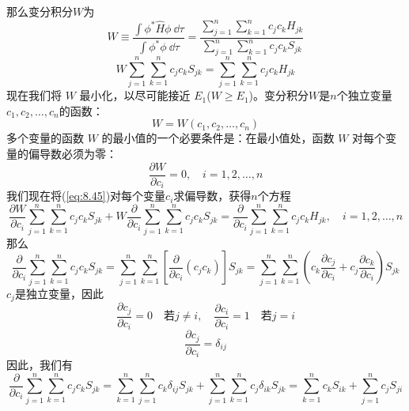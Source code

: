     那么变分积分$W$为
    \begin{equation}
        W \equiv \frac{\int \phi^{\ast} \hat{H} \phi\:\dd \tau}{\int \phi^{\ast} \phi\:\dd \tau} = \frac{\sum_{j=1}^{n}\sum_{k=1}^{n}c_jc_kH_{jk}}{\sum_{j=1}^{n}\sum_{k=1}^{n}c_jc_kS_{jk}}
        \label{eq:8.44}
    \end{equation}
    \begin{equation}
        W\sum_{j=1}^{n}\sum_{k=1}^{n}c_jc_kS_{jk} = \sum_{j=1}^{n}\sum_{k=1}^{n}c_jc_kH_{jk}
        \label{eq:8.45}
    \end{equation}
    现在我们将 $W$ 最小化，以尽可能接近 $E_1$($W \geq E_1$)。变分积分$W$是$n$个独立变量$c_1,c_2,\ldots,c_n$的函数：
    \begin{equation*}
        W = W\left(c_1,c_2,\ldots,c_n\right)
    \end{equation*}
    多个变量的函数 $W$ 的最小值的一个必要条件是：在最小值处，函数 $W$ 对每个变量的偏导数必须为零：
    \begin{equation}
        \frac{\partial W}{\partial c_i} = 0, \quad i = 1,2,\ldots,n
        \label{eq:8.46}
    \end{equation}
    我们现在将(\ref{eq:8.45})对每个变量$c_i$求偏导数，获得$n$个方程
    \begin{equation}
        \frac{\partial W}{\partial c_i}\sum_{j=1}^{n}\sum_{k=1}^{n}c_jc_kS_{jk} + W\frac{\partial}{\partial c_i}\sum_{j=1}^{n}\sum_{k=1}^{n}c_jc_kS_{jk} = \frac{\partial}{\partial c_i}\sum_{j=1}^{n}\sum_{k=1}^{n}c_jc_kH_{jk}, \quad i = 1,2,\ldots,n
        \label{eq:8.47}
    \end{equation}
    那么
    \begin{equation*}
        \frac{\partial}{\partial c_i}\sum_{j=1}^{n}\sum_{k=1}^{n}c_jc_kS_{jk} = \sum_{j=1}^{n}\sum_{k=1}^{n}\left[\frac{\partial}{\partial c_i}\left(c_jc_k\right)\right]S_{jk} = \sum_{j=1}^{n}\sum_{k=1}^{n}\left(c_k\frac{\partial c_j}{\partial c_i} + c_j\frac{\partial c_k}{\partial c_i}\right)S_{jk}
    \end{equation*}
    $c_j$是独立变量，因此
    \begin{equation*}
        \frac{\partial c_j}{\partial c_i} = 0 \quad \text{若} j \neq i, \quad \frac{\partial c_i}{\partial c_i} = 1
        \quad \text{若} j = i
    \end{equation*}
    \begin{equation}
        \frac{\partial c_j}{\partial c_i} = \delta_{ij}
        \label{eq:8.48}
    \end{equation}
    因此，我们有
    \begin{equation*}
        \frac{\partial}{\partial c_i}\sum_{j=1}^{n}\sum_{k=1}^{n} c_jc_kS_{jk} = \sum_{k=1}^{n}\sum_{j=1}^{n}c_k\delta_{ij}S_{jk} + \sum_{j=1}^{n}\sum_{k=1}^{n}c_j\delta_{ik}S_{jk} = \sum_{k=1}^{n}c_kS_{ik} + \sum_{j=1}^{n}c_jS_{ji}
    \end{equation*}
